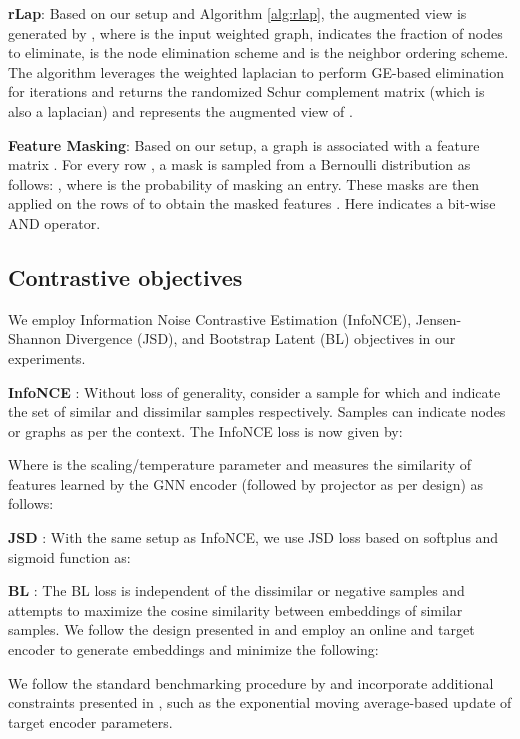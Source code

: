 \documentclass{article}
\theoremstyle{plain}
\theoremstyle{definition}
\theoremstyle{remark}
\begin{document}
\textbf{rLap}: Based on our setup and Algorithm \ref{alg:rlap}, the augmented view is generated by , where  is the input weighted graph,  indicates the fraction of nodes to eliminate,  is the node elimination scheme and  is the neighbor ordering scheme. The algorithm leverages the weighted laplacian  to perform GE-based elimination for  iterations and returns the randomized Schur complement matrix (which is also a laplacian) and represents the augmented view of .

\textbf{Feature Masking}: Based on our setup, a graph  is associated with a feature matrix . For every row , a mask  is sampled from a Bernoulli distribution as follows: , where  is the probability of masking an entry. These masks are then applied on the rows of  to obtain the masked features . Here  indicates a bit-wise AND operator.

\subsection{Contrastive objectives}

We employ Information Noise Contrastive Estimation (InfoNCE), Jensen-Shannon Divergence (JSD), and Bootstrap Latent (BL) objectives in our experiments.

\textbf{InfoNCE} \citep{oord2018representation}: Without loss of generality, consider a sample  for which  and  indicate the set of similar and dissimilar samples respectively. Samples can indicate nodes or graphs as per the context. The InfoNCE loss is now given by:

Where  is the scaling/temperature parameter and  measures the similarity of features  learned by the GNN encoder (followed by projector as per design) as follows:

\textbf{JSD} \citep{lin1991divergence}: With the same setup as InfoNCE, we use JSD loss based on softplus and sigmoid function  as:



\textbf{BL} \citep{thakoor2021bootstrapped}: The BL loss is independent of the dissimilar or negative samples  and attempts to maximize the cosine similarity between embeddings of similar samples. We follow the design presented in \citet{thakoor2021bootstrapped} and employ an online and target encoder to generate embeddings and minimize the following:


We follow the standard benchmarking procedure by \citet{zhu2021empirical} and incorporate additional constraints presented in  \citet{thakoor2021bootstrapped}, such as the exponential moving average-based update of target encoder parameters.
\end{document}
